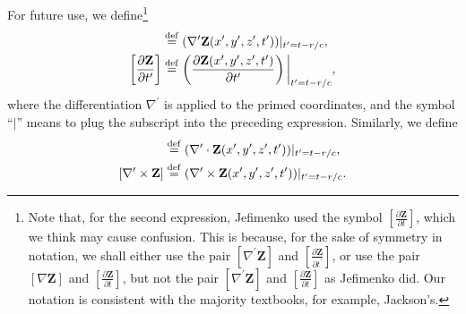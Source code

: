 \documentclass[11pt]{article}              %
\begin{document}
For future use, we define\footnote{Note that, for the second expression, Jefimenko used the symbol $\left[\frac{\partial{\mathbf Z}}{\partial t}\right]$, which we think may cause confusion. This is because, for the sake of symmetry in notation, we shall either use the pair $[\nabla^\prime {\mathbf Z}]$ and $\left[\frac{\partial{\mathbf Z}}{\partial t^\prime}\right]$, or use the pair $[\nabla{\mathbf Z}]$ and $\left[\frac{\partial{\mathbf Z}}{\partial t}\right]$, but not the pair $[\nabla^\prime {\mathbf Z}]$ and $\left[\frac{\partial{\mathbf Z}}{\partial t}\right]$ as Jefimenko did. Our notation is consistent with the majority textbooks, for example, Jackson's\cite{jackson1998classical}.}
\begin{align}
    [\nabla^\prime {\mathbf Z}]&\stackrel{\operatorname{def}}{=}(\nabla^\prime{\mathbf Z}(x^\prime,y^\prime,z^\prime,t^\prime))|_{t^\prime=t-r/c},\notag\\
    \left[\frac{\partial{\mathbf Z}}{\partial t^\prime}\right] &\stackrel{\operatorname{def}}{=}\left(\frac{\partial{\mathbf Z} (x^\prime,y^\prime,z^\prime,t^\prime)}{\partial t^\prime}\right)\bigg\rvert_{t^\prime=t-r/c},\notag
\end{align}
where the differentiation $\nabla^\prime$ is applied to the primed coordinates, and the symbol ``$|$'' means to plug the subscript into the preceding expression. Similarly, we define
\begin{align}
    [\nabla^\prime \cdot {\mathbf Z}]&\stackrel{\operatorname{def}}{=}(\nabla^\prime\cdot {\mathbf Z}(x^\prime,y^\prime,z^\prime,t^\prime))|_{t^\prime=t-r/c},\notag\\
    [\nabla^\prime \times {\mathbf Z}]&\stackrel{\operatorname{def}}{=}(\nabla^\prime\times{\mathbf Z}(x^\prime,y^\prime,z^\prime,t^\prime))|_{t^\prime=t-r/c}.\notag
\end{align}

\end{document}
